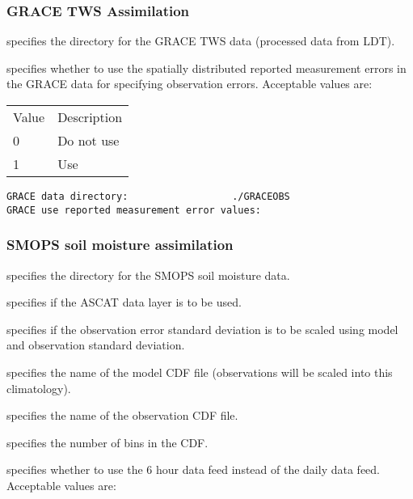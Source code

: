  
 \subsubsection{GRACE TWS Assimilation}
 \label{sssec:gracetwsda}
 

 
  specifies the directory for the
 GRACE TWS data (processed data from LDT).

  specifies
 whether to use the spatially distributed reported measurement
 errors in the GRACE data for specifying observation errors.
 Acceptable values are: 

 \begin{tabular}{ll}
 Value & Description \\
 0     & Do not use  \\
 1     & Use         \\
 \end{tabular}
 

 \begin{Verbatim}[frame=single]
GRACE data directory:                  ./GRACEOBS
GRACE use reported measurement error values:
 \end{Verbatim}

 
 \subsubsection{SMOPS soil moisture assimilation}
 \label{sssec:smopssmda}
 

 
  specifies the directory
 for the SMOPS soil moisture data.

  specifies if the 
 ASCAT data layer is to be used.

  specifies if
 the observation error standard deviation is to be scaled using
 model and observation standard deviation.

  specifies the
 name of the model CDF file (observations will be scaled into this
 climatology).

  specifies the
 name of the observation CDF file.

  specifies the
 number of bins in the CDF.

  specifies whether to use
 the 6 hour data feed instead of the daily data feed.
 Acceptable values are: 

